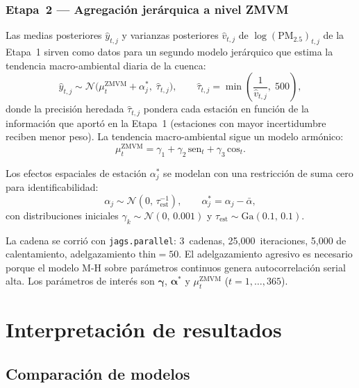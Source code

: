 \documentclass[12pt]{article}
\begin{document}
\subsubsection*{Etapa~2 --- Agregaci\'on jer\'arquica a nivel ZMVM}

Las medias posteriores $\hat{y}_{t,j}$ y varianzas posteriores
$\hat{v}_{t,j}$ de $\log(\text{PM}_{2.5})_{t,j}$ de la Etapa~1
sirven como datos para un segundo modelo jer\'arquico que estima la
tendencia macro-ambiental diaria de la cuenca:
\[
  \hat{y}_{t,j} \sim \mathcal{N}\!\bigl(\mu^\text{ZMVM}_t + \alpha^\ast_j,\;
  \hat\tau_{t,j}\bigr), \qquad
  \hat\tau_{t,j} = \min\!\left(\frac{1}{\hat{v}_{t,j}},\; 500\right),
\]
donde la precisi\'on heredada $\hat\tau_{t,j}$ pondera cada estaci\'on
en funci\'on de la informaci\'on que aport\'o en la Etapa~1 (estaciones
con mayor incertidumbre reciben menor peso).
La tendencia macro-ambiental sigue un modelo arm\'onico:
\[
  \mu^\text{ZMVM}_t = \gamma_1 + \gamma_2\,\text{sen}_t + \gamma_3\,\text{cos}_t.
\]

Los efectos espaciales de estaci\'on $\alpha^\ast_j$ se modelan con una
restricci\'on de suma cero para identificabilidad:
\[
  \alpha_j \sim \mathcal{N}(0,\,\tau_\text{est}^{-1}), \qquad
  \alpha^\ast_j = \alpha_j - \bar\alpha,
\]
con distribuciones iniciales $\gamma_k \sim \mathcal{N}(0,\,0.001)$
y $\tau_\text{est} \sim \text{Ga}(0.1,\,0.1)$.

La cadena se corri\'o con \texttt{jags.parallel}: 3~cadenas,
25{,}000~iteraciones, 5{,}000 de calentamiento, adelgazamiento $\text{thin}=50$.
El adelgazamiento agresivo es necesario porque el modelo M-H sobre
par\'ametros continuos genera autocorrelaci\'on serial alta.
Los par\'ametros de inter\'es son $\boldsymbol\gamma$,
$\boldsymbol\alpha^\ast$ y $\mu^\text{ZMVM}_t$ ($t = 1,\ldots,365$).


\section{Interpretaci\'on de resultados}

\subsection{Comparaci\'on de modelos}
\end{document}
